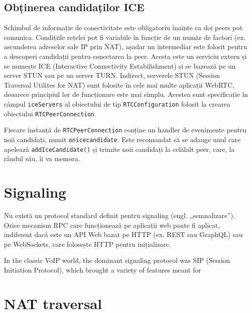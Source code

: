 \subsection{Obținerea candidaților ICE}
\label{sec:ch2sec2subsec4}

\indent \par Schimbul de informație de conectivitate este obligatoriu înainte ca doi peers pot comunica. Condițiile rețelei pot fi variabile în funcție de un număr de factori (ex. ascunderea adreselor sale IP prin NAT), așadar un intermediar este folosit pentru a descoperi candidații pentru conectarea la peer. Acesta este un serviciu extern și se numește ICE (Interactive Connectivity Estabilishment) și se bazează pe un server STUN sau pe un server TURN. Indirect, serverele STUN (Session Traversal Utilites for NAT) sunt folosite în cele mai multe aplicații WebRTC, deoarece principiul lor de funcționare este mai simplu. Acestea sunt specificație în câmpul \texttt{iceServers} al obiectului de tip \texttt{RTCConfiguration} folosit la crearea obiectului \texttt{RTCPeerConnection}.
\indent \par Fiecare instanță de \texttt{RTCPeerConnection} conține un handler de evenimente pentru noii candidați, numit \texttt{onicecandidate}. Este recomandat să se adauge unul care apelează \texttt{addIceCandidate()} și trimite noii candidați la celălalt peer, care, la rândul său, îi va memora.

\section{Signaling}
\label{sec:ch2sec3}
\indent \par Nu există un protocol standard definit pentru signaling (engl. „semnalizare”). Orice mecanism RPC care funcționează pe aplicații web poate fi aplicat, indiferent dacă este un API Web bazat pe HTTP (ex. REST sau GraphQL) sau pe WebSockets, care folosește HTTP pentru inițializare. 
\indent \par In the classic VoIP world, the dominant signaling protocol was SIP (Session Initiation Protocol), which brought a variety of features meant for 

\section{NAT traversal}
\label{sec:ch2sec4}